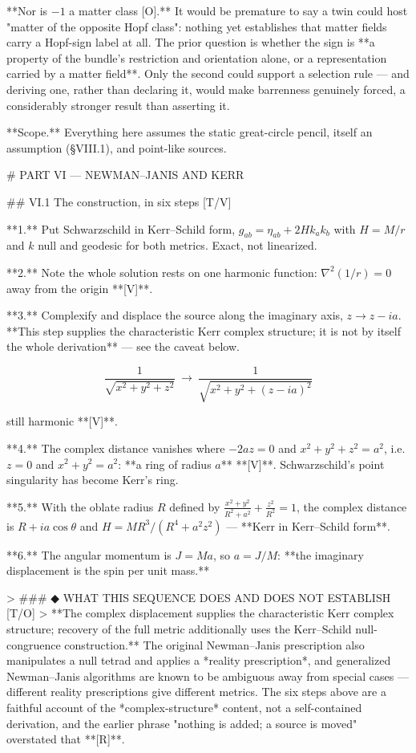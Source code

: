 **Nor is $-1$ a matter class [O].** It would be premature to say a twin could host "matter of the opposite Hopf class": nothing yet establishes that matter fields carry a Hopf-sign label at all. The prior question is whether the sign is **a property of the bundle's restriction and orientation alone, or a representation carried by a matter field**. Only the second could support a selection rule — and deriving one, rather than declaring it, would make barrenness genuinely forced, a considerably stronger result than asserting it.

**Scope.** Everything here assumes the static great-circle pencil, itself an assumption (§VIII.1), and point-like sources.

# PART VI — NEWMAN–JANIS AND KERR

## VI.1 The construction, in six steps [T/V]

**1.** Put Schwarzschild in Kerr–Schild form, $g_{ab} = \eta_{ab}+2Hk_ak_b$ with $H = M/r$ and $k$ null and geodesic for both metrics. Exact, not linearized.

**2.** Note the whole solution rests on one harmonic function: $\nabla^2(1/r) = 0$ away from the origin **[V]**.

**3.** Complexify and displace the source along the imaginary axis, $z\to z-ia$. **This step supplies the characteristic Kerr complex structure; it is not by itself the whole derivation** — see the caveat below.

$$\frac{1}{\sqrt{x^2+y^2+z^2} }\ \longrightarrow\ \frac{1}{\sqrt{x^2+y^2+(z-ia)^2} }$$

still harmonic **[V]**.

**4.** The complex distance vanishes where $-2az = 0$ and $x^2+y^2+z^2 = a^2$, i.e. $z = 0$ and $x^2+y^2 = a^2$: **a ring of radius $a$** **[V]**. Schwarzschild's point singularity has become Kerr's ring.

**5.** With the oblate radius $R$ defined by $\frac{x^2+y^2}{R^2+a^2}+\frac{z^2}{R^2} = 1$, the complex distance is $R+ia\cos\theta$ and $H = MR^3/(R^4+a^2z^2)$ — **Kerr in Kerr–Schild form**.

**6.** The angular momentum is $J = Ma$, so $a = J/M$: **the imaginary displacement is the spin per unit mass.**

> ### ◆ WHAT THIS SEQUENCE DOES AND DOES NOT ESTABLISH [T/O]
> **The complex displacement supplies the characteristic Kerr complex structure; recovery of the full metric additionally uses the Kerr–Schild null-congruence construction.** The original Newman–Janis prescription also manipulates a null tetrad and applies a *reality prescription*, and generalized Newman–Janis algorithms are known to be ambiguous away from special cases — different reality prescriptions give different metrics. The six steps above are a faithful account of the *complex-structure* content, not a self-contained derivation, and the earlier phrase "nothing is added; a source is moved" overstated that **[R]**.

